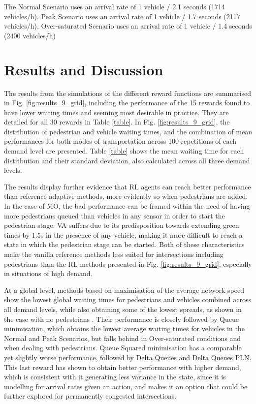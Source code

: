 \documentclass[sigconf,anonymous]{aamas}
\begin{document}
The Normal Scenario uses an arrival rate of 1 vehicle / 2.1 seconds (1714 vehicles/h). Peak Scenario uses an arrival rate of 1 vehicle / 1.7 seconds (2117 vehicles/h). Over-saturated Scenario uses an arrival rate of 1 vehicle / 1.4 seconds (2400 vehicles/h)


\section{Results and Discussion}
\label{results}
The results from the simulations of the different reward functions are summarised in Fig. \ref{fig:results_9_grid}, including the performance of the 15 rewards found to have lower waiting times and seeming most desirable in practice. They are detailed for all 30 rewards in Table \ref{table}.
In Fig. \ref{fig:results_9_grid}, the distribution of pedestrian and vehicle waiting times, and the combination of mean performances for both modes of transportation across 100 repetitions of each demand level are presented.
Table \ref{table} shows the mean waiting time for each distribution and their standard deviation, also calculated across all three demand levels. 

The results display further evidence that RL agents can reach better performance than reference adaptive methods, more evidently so when pedestrians are added.
In the case of MO, the bad performance can be framed within the need of having more pedestrians queued than vehicles in any sensor in order to start the pedestrian stage.
VA suffers due to its predisposition towards extending green times by 1.5s in the presence of any vehicle, making it more difficult to reach a state in which the pedestrian stage can be started.
Both of these characteristics make the vanilla reference methods less suited for intersections including pedestrians than the RL methods presented in Fig. \ref{fig:results_9_grid}, especially in situations of high demand.

At a global level, methods based on maximisation of the average network speed show the lowest global waiting times for pedestrians and vehicles combined across all demand levels, while also obtaining some of the lowest spreads, as shown in the case with no pedestrians \cite{previous}.
Their performance is closely followed by Queue minimisation, which obtains the lowest average waiting times for vehicles in the Normal and Peak Scenarios, but falls behind in Over-saturated conditions and when dealing with pedestrians.
Queue Squared minimisation has a comparable yet slightly worse performance, followed by Delta Queues and Delta Queues PLN.
This last reward has shown to obtain better performance with higher demand, which is consistent with it generating less variance in the state, since it is modelling for arrival rates given an action, and makes it an option that could be further explored for permanently congested intersections.
\end{document}

